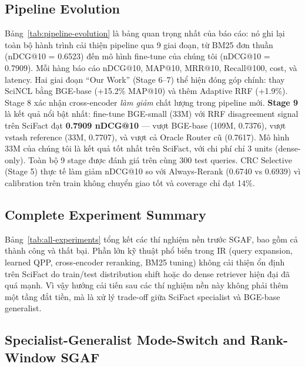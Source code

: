 

\subsection{Pipeline Evolution}
\label{sec:results:evolution}

Bảng~\ref{tab:pipeline-evolution} là bảng quan trọng nhất của báo cáo: nó ghi lại toàn bộ hành trình
cải thiện pipeline qua 9 giai đoạn, từ BM25 đơn thuần (nDCG@10 = 0.6523) đến mô hình fine-tune của
chúng tôi (nDCG@10 = 0.7909). Mỗi hàng báo cáo nDCG@10, MAP@10, MRR@10, Recall@100, cost, và
latency. Hai giai đoạn ``Our Work'' (Stage 6--7) thể hiện đóng góp chính: thay SciNCL bằng BGE-base
(+15.2\% MAP@10) và thêm Adaptive RRF (+1.9\%). Stage 8 xác nhận cross-encoder \emph{làm giảm} chất
lượng trong pipeline mới. \textbf{Stage 9} là kết quả nổi bật nhất: fine-tune BGE-small (33M) với
RRF disagreement signal trên SciFact đạt \textbf{0.7909 nDCG@10} --- vượt BGE-base (109M, 0.7376),
vượt vstash reference (33M, 0.7707), và vượt cả Oracle Router cũ (0.7617). Mô hình 33M của chúng
tôi là kết quả tốt nhất trên SciFact, với chi phí chỉ 3 units (dense-only). Toàn bộ 9 stage được
đánh giá trên cùng 300 test queries. CRC Selective (Stage 5) thực tế làm giảm nDCG@10 so với
Always-Rerank (0.6740 vs 0.6939) vì calibration trên train không chuyển giao tốt và coverage chỉ
đạt 14\%.



\subsection{Complete Experiment Summary}
\label{sec:results:summary}

Bảng~\ref{tab:all-experiments} tổng kết các thí nghiệm nền trước SGAF, bao gồm cả thành công và thất
bại. Phần lớn kỹ thuật phổ biến trong IR (query expansion, learned QPP, cross-encoder reranking,
BM25 tuning) không cải thiện ổn định trên SciFact do train/test distribution shift hoặc do dense
retriever hiện đại đã quá mạnh. Vì vậy hướng cải tiến sau các thí nghiệm nền này không phải thêm một tầng đắt tiền,
mà là xử lý trade-off giữa SciFact specialist và BGE-base generalist.



\subsection{Specialist-Generalist Mode-Switch and Rank-Window SGAF}
\label{sec:results:sgaf-mode-switch}

